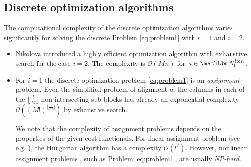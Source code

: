 \documentclass[runningheads,a4paper]{llncs}\usepackage{latexsym}
\newcommand{\N}{\mathbbm N}
\begin{document}
\subsection{Discrete optimization algorithms}
The computational complexity of the discrete optimization algorithms varies significantly for solving the discrete Problem \eqref{eq:problem1} 
with $i=1$ and $i=2$.
\begin{itemize}
\item Nikolova \cite{Nik09p,Nik09} introduced a highly efficient optimization algorithm with exhaustive search for the case $i=2$.
      The complexity is $\mathcal{O}(M n)$ for $u \in \N_0^{l \times n}$. 
\item For $i=1$ the discrete optimization problem \eqref{eq:problem1} is an \emph{assignment} problem. Even the 
      simplified problem of alignment of the columns in each of the $\lfloor \frac{l}{M} \rfloor$ non-intersecting 
      sub-blocks has already an exponential complexity $\mathcal{O}((M!)^{\lfloor \frac{l}{M} \rfloor}) $ by exhaustive search.
 
      We note that the complexity of assignment problems depends on the properties of the given cost functionals.
      For linear assignment problem (see e.g. \cite{BurDelMar09}), the Hungarian algorithm \cite{Mun57} has a complexity 
      $\mathcal{O}(l^3)$. However, nonlinear assignment problems \cite{Vos00}, such as Problem \eqref{eq:problem1}, are 
      usually \emph{NP-hard}.
\end{itemize} 
\end{document}
